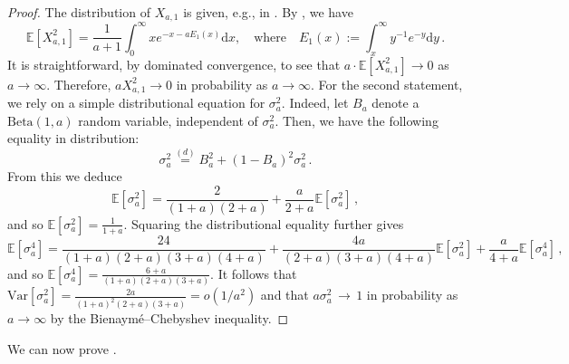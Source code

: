 \documentclass{article}
\theoremstyle{remark}
\newcommand{\cv}[1]{\,\underset{#1}{\longrightarrow}\,}
\newcommand{\expec}[1]{\mathbb{E}{\left[#1\right]}}
\newcommand{\var}[1]{\mathrm{Var}{\left[#1\right]}}
\newcommand{\BetaDistribution}[2]{\mathrm{Beta}{\left(#1,#2\right)}}
\begin{document}
\begin{proof}
    The distribution of $X_{a,1}$ is given, e.g., in \cite{Arratia_Barbour_Tavare_2003}.
    By \cite[Eq.\ (4.101)]{Arratia_Barbour_Tavare_2003}, we have
    \begin{equation*}
        \expec{X_{a,1}^2}
        = \frac{1}{a+1} \int_0^\infty x e^{-x-aE_1(x)} \mathrm dx,
        \quad\text{where}\quad
        E_1(x) := \int_x^\infty y^{-1} e^{-y} \mathrm dy \,.
    \end{equation*}
    It is straightforward, by dominated convergence, to see that $a \cdot \expec{X_{a,1}^2} \to 0$ as $a\to\infty$.
    Therefore, $a X_{a,1}^2 \to 0$ in probability as $a\to\infty$.
    For the second statement, we rely on a simple distributional equation for $\sigma_a^2$.
    Indeed, let $B_a$ denote a $\BetaDistribution{1}{a}$ random variable, independent of $\sigma_a^2$.
    Then, we have the following equality in distribution:
    \begin{equation*}
        \sigma_a^2 \overset{(d)}{=} B_a^2 + (1-B_a)^2 \sigma_a^2 \,.
    \end{equation*}
    From this we deduce
    \[
        \expec{\sigma_a^2} = \frac{2}{(1+a)(2+a)} + \frac{a}{2+a} \expec{\sigma_a^2}\,,
    \]
    and so $\expec{\sigma_a^2} = \frac{1}{1+a}$.
    Squaring the distributional equality further gives
    \[
        \expec{\sigma_a^4} = \frac{24}{(1+a)(2+a)(3+a)(4+a)}
        + \frac{4a}{(2+a)(3+a)(4+a)} \expec{\sigma_a^2} + \frac{a}{4+a} \expec{\sigma_a^4}\,,
    \]
    and so $\expec{\sigma_a^4} = \frac{6+a}{(1+a)(2+a)(3+a)}$.
    It follows that $\var{\sigma_a^2} = \frac{2a}{(1+a)^2(2+a)(3+a)} = o(1/a^2)$ and that $a\sigma_a^2 \cv{} 1$ in probability as $a\to\infty$ by the Bienaymé--Chebyshev inequality.
\end{proof}

We can now prove .
\end{document}
